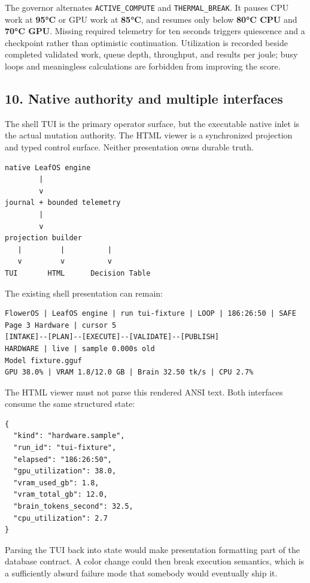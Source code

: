 The governor alternates \texttt{ACTIVE\_COMPUTE} and \texttt{THERMAL\_BREAK}. It pauses CPU work
at \textbf{95°C} or GPU work at \textbf{85°C}, and resumes only below \textbf{80°C CPU} and
\textbf{70°C GPU}. Missing required telemetry for ten seconds triggers quiescence and
a checkpoint rather than optimistic continuation. Utilization is recorded
beside completed validated work, queue depth, throughput, and results per joule;
busy loops and meaningless calculations are forbidden from improving the
score.

\subsection{10. Native authority and multiple interfaces}

The shell TUI is the primary operator surface, but the executable native inlet
is the actual mutation authority. The HTML viewer is a synchronized projection
and typed control surface. Neither presentation owns durable truth.

\begin{verbatim}
native LeafOS engine
        |
        v
journal + bounded telemetry
        |
        v
projection builder
   |         |          |
   v         v          v
TUI       HTML      Decision Table
\end{verbatim}

The existing shell presentation can remain:

\begin{verbatim}
FlowerOS | LeafOS engine | run tui-fixture | LOOP | 186:26:50 | SAFE
Page 3 Hardware | cursor 5
[INTAKE]--[PLAN]--[EXECUTE]--[VALIDATE]--[PUBLISH]
HARDWARE | live | sample 0.000s old
Model fixture.gguf
GPU 38.0% | VRAM 1.8/12.0 GB | Brain 32.50 tk/s | CPU 2.7%
\end{verbatim}

The HTML viewer must not parse this rendered ANSI text. Both interfaces consume
the same structured state:

\begin{verbatim}
{
  "kind": "hardware.sample",
  "run_id": "tui-fixture",
  "elapsed": "186:26:50",
  "gpu_utilization": 38.0,
  "vram_used_gb": 1.8,
  "vram_total_gb": 12.0,
  "brain_tokens_second": 32.5,
  "cpu_utilization": 2.7
}
\end{verbatim}

Parsing the TUI back into state would make presentation formatting part of the
database contract. A color change could then break execution semantics, which
is a sufficiently absurd failure mode that somebody would eventually ship it.

